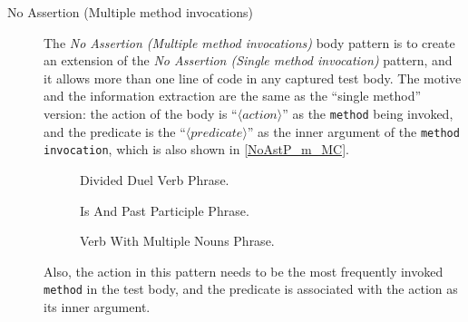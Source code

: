 \documentclass[proposal.tex]{subfiles}
\begin{document}
\begin{description}
\item[No Assertion (Multiple method invocations)]


The \textit{No Assertion (Multiple method invocations)} body pattern is to create an extension of the \textit{No Assertion (Single method invocation)} pattern, and it allows more than one line of code in any captured test body.
%
The motive and the information extraction are the same as the \enquote{single method} version: the action of the body is \enquote{$\langle action \rangle$} as the \texttt{method} being invoked, and the predicate is the \enquote{$\langle predicate \rangle$} as the inner argument of the \texttt{method invocation}, which is also shown in \cref{NoAstP_m_MC}.

\begin{figure}[ht]
\centering
    \begin{subfigure}{0.65\textwidth}
    \end{subfigure}
\caption{Divided Duel Verb Phrase.}
\label{fig:divided-dual-verb}
\end{figure}

\begin{figure}[H]
\centering
    \begin{subfigure}{0.65\textwidth}
    \end{subfigure}
\caption{Is And Past Participle Phrase.}
\label{fig:IsAndPast}
\end{figure}

\begin{figure}[H]
\centering
    \begin{subfigure}{0.65\textwidth}
    \end{subfigure}
\caption{Verb With Multiple Nouns Phrase.}
\label{fig:name_vmn}
\end{figure}

Also, the action in this pattern needs to be the most frequently invoked \texttt{method} in the test body, and the predicate is associated with the action as its inner argument.

\end{description}
\end{document}

